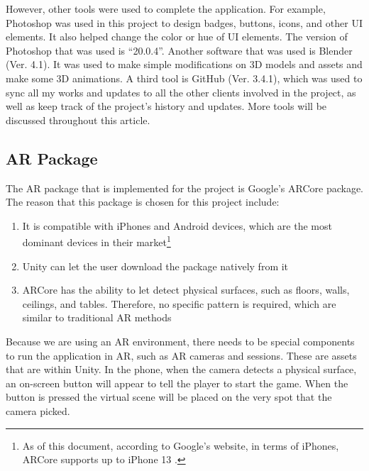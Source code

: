 However, other tools were used to complete the application. For example, Photoshop was used in this project to design badges, buttons, icons, and other UI elements. It also helped change the color or hue of UI elements. The version of Photoshop that was used is “20.0.4”. Another software that was used is Blender (Ver. 4.1). It was used to make simple modifications on 3D models and assets and make some 3D animations. A third tool is GitHub (Ver. 3.4.1), which was used to sync all my works and updates to all the other clients involved in the project, as well as keep track of the project's history and updates. More tools will be discussed throughout this article.

\subsection{AR Package}

The AR package that is implemented for the project is Google’s ARCore package. The reason that this package is chosen for this project include:
\begin{enumerate}
    \item{It is compatible with iPhones and Android devices, which are the most dominant devices in their market\footnote{As of this document, according to Google’s website, in terms of iPhones, ARCore supports up to iPhone 13 \cite{ARCoreDevices}.}}
    
    \item{Unity can let the user download the package natively from it}
    
    \item{ARCore has the ability to let detect physical surfaces, such as floors, walls, ceilings, and tables. Therefore, no specific pattern is required, which are similar to traditional AR methods}

\end{enumerate}
Because we are using an AR environment, there needs to be special components to run the application in AR, such as AR cameras and sessions. These are assets that are within Unity. In the phone, when the camera detects a physical surface, an on-screen button will appear to tell the player to start the game. When the button is pressed the virtual scene will be placed on the very spot that the camera picked.

